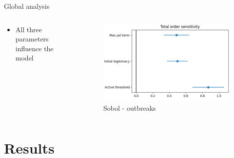 \documentclass[10pt]{beamer}
\begin{document}
    \begin{frame}{Global analysis}

        \begin{columns}
            \begin{column}{.3\textwidth}
                \begin{itemize}
                    \item All three parameters influence the model
                \end{itemize}
            \end{column}
            \begin{column}{0.7\textwidth}
                \begin{figure}
                    \centering
                    \includegraphics[width=\textwidth]{pictures/sensitivity_analysis/global_sa.png}
                    \caption{Sobol - outbreaks}
                \end{figure}
            \end{column}
        \end{columns}

    \end{frame}


    \section{Results}
\end{document}
